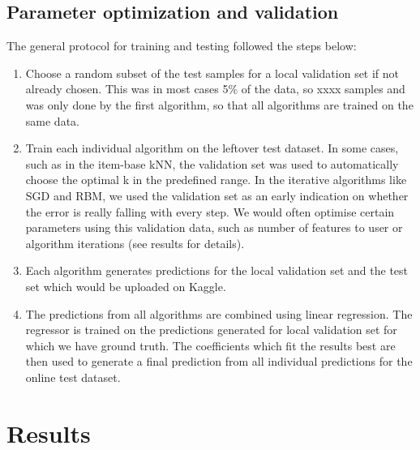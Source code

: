 \documentclass[10pt,conference,compsocconf]{IEEEtran}
\begin{document}
\subsection{Parameter optimization and validation} 
The general protocol for training and testing followed the steps below:

\begin{enumerate}
\item Choose a random subset of the test samples for a local validation set if not already chosen. This was in most cases 5\% of the data, so xxxx samples and was only done by the first algorithm, so that all algorithms are trained on the same data.

\item Train each individual algorithm on the leftover test dataset. In some cases, such as in the item-base kNN, the validation set was used to automatically choose the optimal k in the predefined range. In the iterative algorithms like SGD and RBM, we used the validation set as an early indication on whether the error is really falling with every step. We would often optimise certain parameters using this validation data, such as number of features to user or algorithm iterations (see results for details).

\item Each algorithm generates predictions for the local validation set and the test set which would be uploaded on Kaggle.

\item The predictions from all algorithms are combined using linear regression. The regressor is trained on the predictions generated for local validation set for which we have ground truth. The coefficients which fit the results best are then used to generate a final prediction from all individual predictions for the online test dataset.

\end{enumerate}



\section{Results}
\label{sec:results}
\end{document}
